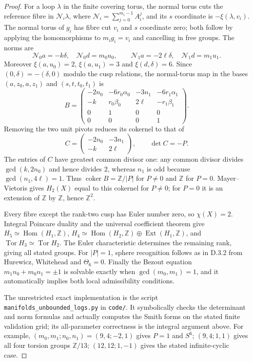 \begin{proof}
For a loop $\lambda$ in the finite covering torus, the normal
torus cuts the reference fibre in
$\mathcal N_i\lambda$, where
$\mathcal N_i=\sum_{j=0}^{m_i-1}A_i^j$, and its $s$ coordinate
is $-\xi(\lambda,v_i)$. The normal torus of $g_i$ has
fibre cut $v_i$ and $s$ coordinate zero; both follow by applying
the homomorphisms to $m_i g_i=v_i$ and cancelling in free groups.
The norms are
\[
 \mathcal N_0a=-k\delta,\quad \mathcal N_0d=m_0u_0,
 \qquad
 \mathcal N_1a=-2\ell\delta,\quad \mathcal N_1d=m_1u_1.
\]
Moreover $\xi(a,u_0)=2$, $\xi(a,u_1)=3$ and
$\xi(d,\delta)=6$. Since $(0,\delta)=-(\delta,0)$ modulo
the cusp relations, the normal-torus map in the bases
$(a,z_0,a,z_1)$ and $(s,t,t_0,t_1)$ is
\[
 B=\begin{pmatrix}
 -2n_0&-6r_0\alpha_0&-3n_1&-6r_1\alpha_1\\
 -k&r_0\beta_0&2\ell&-r_1\beta_1\\
 0&1&0&0\\
 0&0&0&1
 \end{pmatrix}.
\]
Removing the two unit pivots reduces its cokernel to that of
\[
 C=\begin{pmatrix}-2n_0&-3n_1\\-k&2\ell\end{pmatrix},
 \qquad \det C=-P.
\]
The entries of $C$ have greatest common divisor one: any common
divisor divides $\gcd(k,2n_0)$ and hence divides $2$, whereas
$n_1$ is odd because $\gcd(n_1,4\ell)=1$.
Thus $\operatorname{coker}B=\mathbb Z/|P|$ for $P\ne0$
and $\mathbb Z$ for $P=0$. Mayer--Vietoris gives $H_2(X)$
equal to this cokernel for $P\ne0$; for $P=0$ it is an extension
of $\mathbb Z$ by $\mathbb Z$, hence $\mathbb Z^2$.

Every fibre except the rank-two cusp has Euler number zero, so
$\chi(X)=2$. Integral Poincare duality and the universal
coefficient theorem give $H_5\simeq\operatorname{Hom}(H_1,\mathbb Z)$,
$H_4\simeq\operatorname{Hom}(H_2,\mathbb Z)
\oplus\operatorname{Ext}(H_1,\mathbb Z)$, and
$\operatorname{Tor}H_3\simeq\operatorname{Tor}H_2$.
The Euler characteristic determines the remaining rank, giving
all stated groups. For $|P|=1$, sphere recognition follows as in
D.3.2 from Hurewicz, Whitehead and $\Theta_6=0$.
Finally the Bezout equation $m_1n_0+m_0n_1=\pm1$ is solvable
exactly when $\gcd(m_0,m_1)=1$, and it automatically implies both
local admissibility conditions.

The unrestricted exact implementation is the script
\texttt{manifolds\_unbounded\_logs.py} in \texttt{code/}. It symbolically checks
the determinant and norm formulas and actually computes the Smith
forms on the stated finite validation grid; its all-parameter
correctness is the integral argument above. For example,
$(m_0,m_1;n_0,n_1)=(9,4;-2,1)$ gives $P=1$ and $S^6$;
$(9,4;1,1)$ gives all four torsion groups $\mathbb Z/13$;
$(12,12;1,-1)$ gives the stated infinite-cyclic case.
\end{proof}

